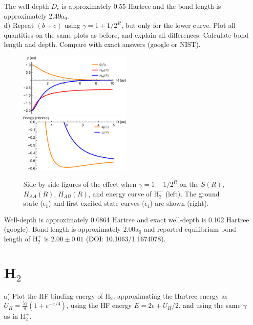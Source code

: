 \documentclass{article}
\begin{document}
{\color{blue}
  The well-depth $D_e$ is approximately 0.55 Hartree and the bond
  length is approximately 2.49a$_0$.}
\\

\noindent d) Repeat $(b+c)$ using $\gamma = 1 + 1/2^R$, but only for the lower curve.
Plot all quantities on the same plots as before, and explain all differences. Calculate
bond length and depth. Compare with exact answers (google or NIST).

\begin{figure}[H]
    \centering
    \includegraphics[width=0.495\textwidth]{h2_gamma.eps}
    \includegraphics[width=0.495\textwidth]{h2_gamma_curve.eps}
    \caption{Side by side figures of the effect when $\gamma= 1 + 1/2^R$
      on the $S(R)$, $H_{AA}(R)$, $H_{AB}(R)$, and energy curve of H$_2^+$ (left).
      The ground state ($\epsilon_1$) and first excited state curves ($\epsilon_1$)
      are shown (right).}
    \label{fig:sidebyside}
\end{figure}

{\color{blue}
  Well-depth is approximately 0.0864 Hartree and exact well-depth is 0.102 Hartree
  (google).
  Bond length is approximately 2.00a$_0$ and reported equilibrium bond length
  of H$_2^+$ is $2.00\pm0.01$ (DOI: 10.1063/1.1674078).
}

\pagebreak

\section*{H$_2$}

\noindent a) Plot the HF binding energy of H$_2$, approximating the Hartree energy
as $U_H=\frac{5\gamma}{8}(1+e^{-x/4})$, using the HF energy $E=2\epsilon + U_H/2$,
and using the same $\gamma$ as in H$_2^+$.
\end{document}
